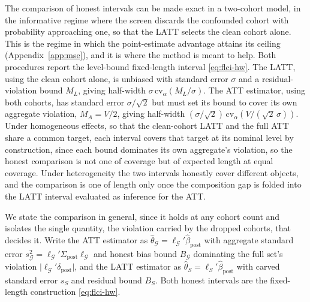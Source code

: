 \documentclass[12pt]{article}
\theoremstyle{remark}
\begin{document}
The comparison of honest intervals can be made exact in a two-cohort model, in the informative regime where
the screen discards the confounded cohort with probability approaching one, so that the LATT selects the
clean cohort alone. This is the regime in which the point-estimate advantage attains its ceiling
(Appendix~\ref{app:mse}), and it is where the method is meant to help. Both procedures report the
level-bound fixed-length interval \eqref{eq:flci-hw}. The LATT, using the clean cohort alone, is unbiased
with standard error $\sigma$ and a residual-violation bound $M_L$, giving half-width
$\sigma\,\mathrm{cv}_\alpha(M_L/\sigma)$. The ATT estimator, using both cohorts, has standard error
$\sigma/\sqrt2$ but must set its bound to cover its own aggregate violation, $M_A=V/2$, giving half-width
$(\sigma/\sqrt2)\,\mathrm{cv}_\alpha(V/(\sqrt2\,\sigma))$. Under homogeneous effects, so that the
clean-cohort LATT and the full ATT share a common target, each interval covers that target at its
nominal level by construction, since each bound dominates its own aggregate's violation, so the honest
comparison is not one of coverage but of expected length at equal coverage. Under heterogeneity the two
intervals honestly cover different objects, and the comparison is one of length only once the composition
gap is folded into the LATT interval evaluated as inference for the ATT.

We state the comparison in general, since it holds at
any cohort count and isolates the single quantity, the violation carried by the dropped
cohorts, that decides it. Write the ATT estimator as
$\hat\theta_{\mathcal G}=\ell_{\mathcal G}'\hat\beta_{\mathrm{post}}$ with aggregate standard
error $s_{\mathcal G}^2=\ell_{\mathcal G}'\Sigma_{\mathrm{post}}\ell_{\mathcal G}$ and honest
bias bound $B_{\mathcal G}$ dominating the full set's violation
$\lvert\ell_{\mathcal G}'\delta_{\mathrm{post}}\rvert$, and the LATT estimator as
$\hat\theta_S=\ell_S'\hat\beta_{\mathrm{post}}$ with carved standard error $s_S$ and residual
bound $B_S$. Both honest intervals are the fixed-length construction \eqref{eq:flci-hw}.
\end{document}
